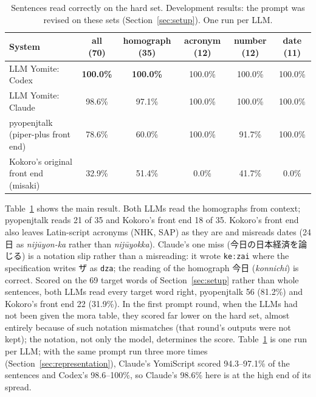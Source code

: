 \documentclass[11pt,a4paper]{article}
\newcommand{\ys}[1]{\mbox{\texttt{#1}}}
\begin{document}
\begin{table}[t]
\centering\small
\caption{Sentences read correctly on the hard set. Development results: the prompt was revised
on these sets (Section~\ref{sec:setup}). One run per LLM.}
\label{tab:hard}
\begin{tabular}{lccccc}
\toprule
System & all (70) & homograph (35) & acronym (12) & number (12) & date (11)\\
\midrule
LLM Yomite: Codex & \textbf{100.0\%} & \textbf{100.0\%} & 100.0\% & 100.0\% & 100.0\%\\
LLM Yomite: Claude & 98.6\% & 97.1\% & 100.0\% & 100.0\% & 100.0\%\\
pyopenjtalk (piper-plus front end) & 78.6\% & 60.0\% & 100.0\% & 91.7\% & 100.0\%\\
Kokoro's original front end (misaki) & 32.9\% & 51.4\% & 0.0\% & 41.7\% & 0.0\%\\
\bottomrule
\end{tabular}
\end{table}

Table~\ref{tab:hard} shows the main result. Both LLMs read the homographs from context; pyopenjtalk reads 21 of 35 and
Kokoro's front end 18 of 35. Kokoro's front end also leaves Latin-script acronyms (NHK, SAP) as they are and misreads
dates (24日 as \emph{nijūyon-ka} rather than \emph{nijūyokka}). Claude's one miss (今日の日本経済を論じる) is a
notation slip rather than a misreading: it wrote \ys{keːzai} where the specification writes ザ as \ys{dza}; the reading
of the homograph 今日 (\emph{konnichi}) is correct. Scored on the 69 target words of Section~\ref{sec:setup} rather
than whole sentences, both LLMs read every target word right, pyopenjtalk 56 (81.2\%) and Kokoro's front end 22
(31.9\%). In the first prompt round, when the LLMs had not been given the mora
table, they scored far lower on the hard set, almost entirely because of such notation mismatches (that round's outputs
were not kept); the notation, not only the model, determines the score. Table~\ref{tab:hard} is one run per LLM; with
the same prompt run three more times (Section~\ref{sec:representation}), Claude's YomiScript scored 94.3--97.1\% of the
sentences and Codex's 98.6--100\%, so Claude's 98.6\% here is at the high end of its spread.
\end{document}
